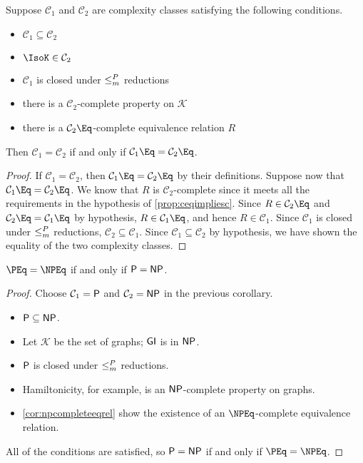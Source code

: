 \begin{proposition}
  Suppose $\mathcal{C}_1$ and $\mathcal{C}_2$ are complexity classes satisfying the following conditions.
  \begin{itemize}
  \item $\mathcal{C}_1 \subseteq \mathcal{C}_2$
  \item $\IsoK \in \mathcal{C}_2$
  \item $\mathcal{C}_1$ is closed under $\mor$ reductions
  \item there is a $\mathcal{C}_2$-complete property on $\mathcal{K}$
  \item there is a $\mathcal{C}_2\Eq$-complete equivalence relation $R$
  \end{itemize}
  Then $\mathcal{C}_1 = \mathcal{C}_2$ if and only if $\mathcal{C}_1\Eq = \mathcal{C}_2\Eq$.
\end{proposition}
\begin{proof}
  If $\mathcal{C}_1 = \mathcal{C}_2$, then $\mathcal{C}_1\Eq = \mathcal{C}_2\Eq$ by their definitions.
  Suppose now that $\mathcal{C}_1\Eq = \mathcal{C}_2\Eq$.
  We know that $R$ is $\mathcal{C}_2$-complete since it meets all the requirements in the hypothesis of \autoref{prop:ceqimpliesc}.
  Since $R \in \mathcal{C}_2\Eq$ and $\mathcal{C}_2\Eq = \mathcal{C}_1\Eq$ by hypothesis, $R \in \mathcal{C}_1\Eq$, and hence $R \in \mathcal{C}_1$.
  Since $\mathcal{C}_1$ is closed under $\mor$ reductions, $\mathcal{C}_2 \subseteq \mathcal{C}_1$.
  Since $\mathcal{C}_1 \subseteq \mathcal{C}_2$ by hypothesis, we have shown the equality of the two complexity classes.
\end{proof}

\begin{corollary}
  $\PEq = \NPEq$ if and only if $\P = \NP$.
\end{corollary}
\begin{proof}
  Choose $\mathcal{C}_1 = \P$ and $\mathcal{C}_2 = \NP$ in the previous corollary.
  \begin{itemize}
  \item $\P \subseteq \NP$.
  \item Let $\mathcal{K}$ be the set of graphs; $\GI$ is in $\NP$.
  \item $\P$ is closed under $\mor$ reductions.
  \item Hamiltonicity, for example, is an $\NP$-complete property on graphs.
  \item \autoref{cor:npcompleteeqrel} show the existence of an $\NPEq$-complete equivalence relation.
  \end{itemize}
  All of the conditions are satisfied, so $\P = \NP$ if and only if $\PEq = \NPEq$.
\end{proof}

